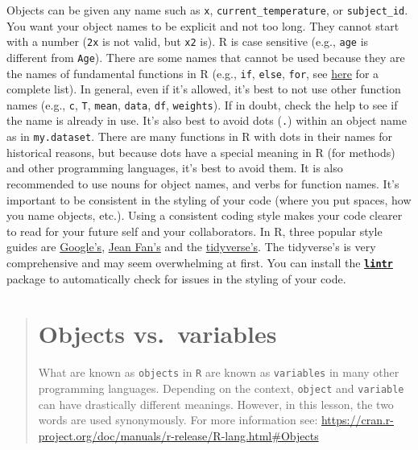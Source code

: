 \documentclass[]{book}
\begin{document}
Objects can be given any name such as \texttt{x},
\texttt{current\_temperature}, or \texttt{subject\_id}. You want your
object names to be explicit and not too long. They cannot start with a
number (\texttt{2x} is not valid, but \texttt{x2} is). R is case
sensitive (e.g., \texttt{age} is different from \texttt{Age}). There are
some names that cannot be used because they are the names of fundamental
functions in R (e.g., \texttt{if}, \texttt{else}, \texttt{for}, see
\href{https://stat.ethz.ch/R-manual/R-devel/library/base/html/Reserved.html}{here}
for a complete list). In general, even if it's allowed, it's best to not
use other function names (e.g., \texttt{c}, \texttt{T}, \texttt{mean},
\texttt{data}, \texttt{df}, \texttt{weights}). If in doubt, check the
help to see if the name is already in use. It's also best to avoid dots
(\texttt{.}) within an object name as in \texttt{my.dataset}. There are
many functions in R with dots in their names for historical reasons, but
because dots have a special meaning in R (for methods) and other
programming languages, it's best to avoid them. It is also recommended
to use nouns for object names, and verbs for function names. It's
important to be consistent in the styling of your code (where you put
spaces, how you name objects, etc.). Using a consistent coding style
makes your code clearer to read for your future self and your
collaborators. In R, three popular style guides are
\href{https://google.github.io/styleguide/Rguide.xml}{Google's},
\href{http://jef.works/R-style-guide/}{Jean Fan's} and the
\href{http://style.tidyverse.org/}{tidyverse's}. The tidyverse's is very
comprehensive and may seem overwhelming at first. You can install the
\href{https://github.com/jimhester/lintr}{\textbf{\texttt{lintr}}}
package to automatically check for issues in the styling of your code.

\begin{quote}
\section{Objects vs.~variables}\label{objects-vs.variables}

What are known as \texttt{objects} in \texttt{R} are known as
\texttt{variables} in many other programming languages. Depending on the
context, \texttt{object} and \texttt{variable} can have drastically
different meanings. However, in this lesson, the two words are used
synonymously. For more information see:
\url{https://cran.r-project.org/doc/manuals/r-release/R-lang.html\#Objects}
\end{quote}
\end{document}
